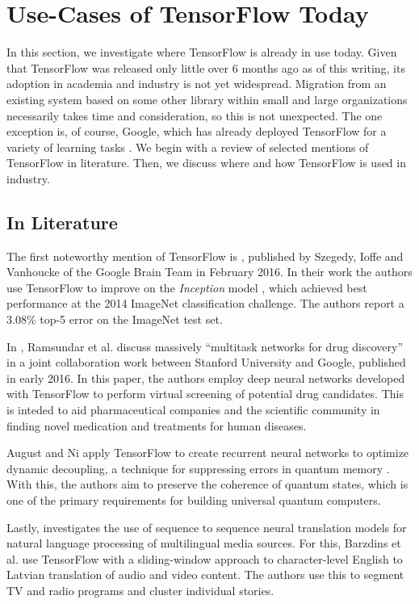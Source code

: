 \section{Use-Cases of TensorFlow Today}\label{sec:uses}

In this section, we investigate where TensorFlow is already in use today. Given
that TensorFlow was released only little over 6 months ago as of this writing,
its adoption in academia and industry is not yet widespread. Migration from an
existing system based on some other library within small and large organizations
necessarily takes time and consideration, so this is not unexpected. The one
exception is, of course, Google, which has already deployed TensorFlow for a
variety of learning tasks \cite{drugs, phones, emails, deepmind, inception}. We
begin with a review of selected mentions of TensorFlow in literature. Then, we
discuss where and how TensorFlow is used in industry.

\subsection{In Literature}\label{sec:uses-lit}

The first noteworthy mention of TensorFlow is \cite{szegedy2016}, published by
Szegedy, Ioffe and Vanhoucke of the Google Brain Team in February 2016. In their
work the authors use TensorFlow to improve on the \emph{Inception} model
\cite{inception}, which achieved best performance at the 2014 ImageNet
classification challenge. The authors report a 3.08\% top-5 error on the
ImageNet test set.

In \cite{drugs}, Ramsundar et al. discuss massively ``multitask networks for
drug discovery'' in a joint collaboration work between Stanford University and
Google, published in early 2016. In this paper, the authors employ deep neural
networks developed with TensorFlow to perform virtual screening of potential
drug candidates. This is inteded to aid pharmaceutical companies and the
scientific community in finding novel medication and treatments for human
diseases.

August and Ni apply TensorFlow to create recurrent neural networks to optimize
dynamic decoupling, a technique for suppressing errors in quantum memory
\cite{august}. With this, the authors aim to preserve the coherence of quantum
states, which is one of the primary requirements for building universal quantum
computers.

Lastly, \cite{barzdins2016} investigates the use of sequence to sequence neural
translation models for natural language processing of multilingual media
sources. For this, Barzdins et al. use TensorFlow with a sliding-window approach
to character-level English to Latvian translation of audio and video
content. The authors use this to segment TV and radio programs and cluster
individual stories.

